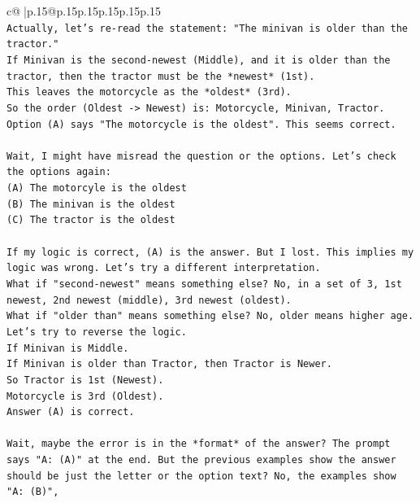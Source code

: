 \documentclass{article}
\begin{document}
{\begin{supertabular}{c@{$\;$}|p{.15\linewidth}@{}p{.15\linewidth}p{.15\linewidth}p{.15\linewidth}p{.15\linewidth}p{.15\linewidth}}
{{{\\ 
\texttt{Actually, let's re{-}read the statement: "The minivan is older than the tractor."} \\
\texttt{If Minivan is the second{-}newest (Middle), and it is older than the tractor, then the tractor must be the *newest* (1st).} \\
\texttt{This leaves the motorcycle as the *oldest* (3rd).} \\
\texttt{So the order (Oldest {-}> Newest) is: Motorcycle, Minivan, Tractor.} \\
\texttt{Option (A) says "The motorcycle is the oldest". This seems correct.} \\
\\ 
\texttt{Wait, I might have misread the question or the options. Let's check the options again:} \\
\texttt{(A) The motorcyle is the oldest} \\
\texttt{(B) The minivan is the oldest} \\
\texttt{(C) The tractor is the oldest} \\
\\ 
\texttt{If my logic is correct, (A) is the answer. But I lost. This implies my logic was wrong. Let's try a different interpretation.} \\
\texttt{What if "second{-}newest" means something else? No, in a set of 3, 1st newest, 2nd newest (middle), 3rd newest (oldest).} \\
\texttt{What if "older than" means something else? No, older means higher age.} \\
\texttt{Let's try to reverse the logic.} \\
\texttt{If Minivan is Middle.} \\
\texttt{If Minivan is older than Tractor, then Tractor is Newer.} \\
\texttt{So Tractor is 1st (Newest).} \\
\texttt{Motorcycle is 3rd (Oldest).} \\
\texttt{Answer (A) is correct.} \\
\\ 
\texttt{Wait, maybe the error is in the *format* of the answer? The prompt says "A: (A)" at the end. But the previous examples show the answer should be just the letter or the option text? No, the examples show "A: (B)",} \\
\\ 
}}}
\end{supertabular}}
\end{document}
